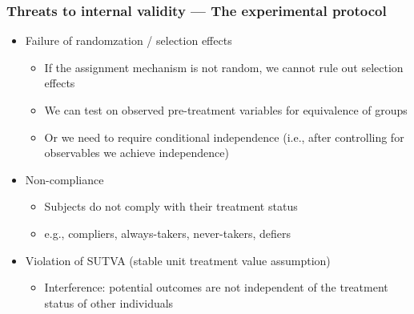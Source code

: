 \documentclass[10pt]{article}
\begin{document}
\subsubsection{Threats to internal validity --- The experimental protocol}
\begin{itemize}
    \item Failure of randomzation / selection effects 
    \begin{itemize}
        \item If the assignment mechanism is not random, we cannot rule out selection effects 
        \item We can test on observed pre-treatment variables for equivalence of groups 
        \item Or we need to require conditional independence (i.e., after controlling for observables we achieve independence)
    \end{itemize}
    \item Non-compliance
    \begin{itemize}
        \item Subjects do not comply with their treatment status 
        \item e.g., compliers, always-takers, never-takers, defiers
    \end{itemize}
    \item Violation of SUTVA (stable unit treatment value assumption)
    \begin{itemize}
        \item Interference: potential outcomes are not independent of the treatment status of other individuals 
    \end{itemize}
\end{itemize}
\end{document}
